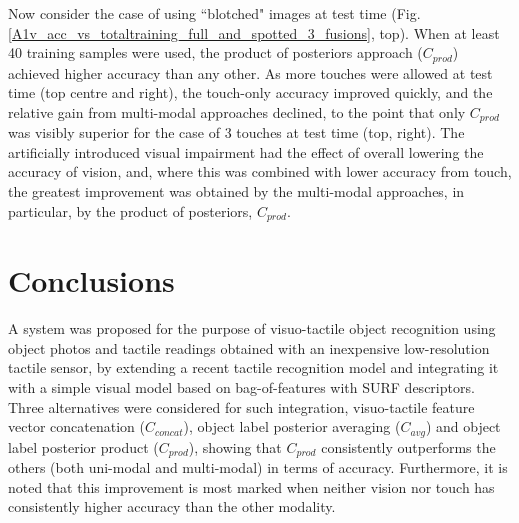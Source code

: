 \documentclass[9pt,technote]{IEEEtran}  %
\begin{document}
Now consider the case of using ``blotched" images at test time (Fig. \ref{A1v_acc_vs_totaltraining_full_and_spotted_3_fusions}, top). When at least 40 training samples were used, the product of posteriors approach ($C_{prod}$) achieved higher accuracy than any other. As more touches were allowed at test time (top centre and right), the touch-only accuracy improved quickly, and the relative gain from multi-modal approaches declined, to the point that only $C_{prod}$ was visibly superior for the case of 3 touches at test time (top, right).
The artificially introduced visual impairment had the effect of overall lowering the accuracy of vision, and, where this was combined with lower accuracy from touch, the greatest improvement was obtained by the multi-modal approaches, in particular, by the product of posteriors, $C_{prod}$.
\begin{figure}
	\centering
	\end{figure}
	
\section{Conclusions}
A system was proposed for the purpose of visuo-tactile object recognition using object photos and tactile readings obtained with an inexpensive low-resolution tactile sensor, by extending a recent tactile recognition model \cite{Corradi2015} and integrating it with a simple visual model based on bag-of-features with SURF descriptors. Three alternatives were considered for such integration, visuo-tactile feature vector concatenation ($C_{concat}$), object label posterior averaging ($C_{avg}$) and object label posterior product ($C_{prod}$), showing that $C_{prod}$ consistently outperforms the others (both uni-modal and multi-modal) in terms of accuracy. Furthermore, it is noted that this improvement is most marked when neither vision nor touch has consistently higher accuracy than the other modality.
\end{document}
